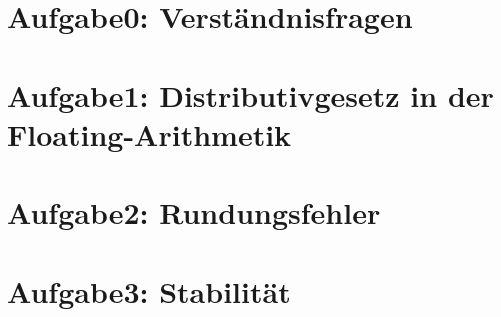 



\maketitle
\tableofcontents
\newpage

\section{Aufgabe0: Verständnisfragen}

\section{Aufgabe1: Distributivgesetz in der Floating-Arithmetik}

\section{Aufgabe2: Rundungsfehler}

\section{Aufgabe3: Stabilität}


